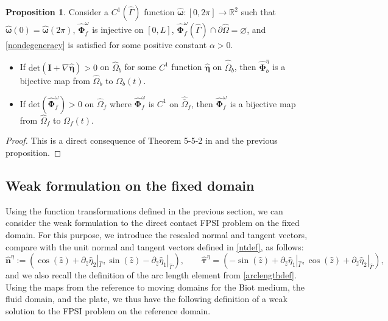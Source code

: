 \documentclass[11pt]{article}
\newcommand{\bd}{\boldsymbol}
\def\R{{\mathbb R}}
\theoremstyle{definition}
\newtheorem{proposition}{Proposition}[section]
\begin{document}
\begin{proposition}\label{mapinjective}
Consider a $C^{1}(\hat{\Gamma})$ function $\hat{\bd{\omega}}: [0, 2\pi] \to \R^{2}$ such that $\hat{\bd{\omega}}(0) = \hat{\bd{\omega}}(2\pi)$, $\hat{\bd{\Phi}}^{\omega}_{f}$ is injective on $[0, L]$, $\hat{\bd{\Phi}}^{\omega}_{f}(\hat{\Gamma}) \cap \partial \hat{\Omega} = \varnothing$, and \eqref{nondegeneracy} is satisfied for some positive constant $\alpha > 0$. 
\begin{itemize}
\item If $\text{det}(\bd{I} + \nabla \hat{\bd{\eta}}) > 0$ on $\hat{\Omega}_{b}$ for some $C^{1}$ function $\hat{\bd{\eta}}$ on $\hat{\overline{\Omega}}_{b}$, then $\hat{\bd{\Phi}}^{\eta}_{b}$ is a bijective map from $\hat{\Omega}_{b}$ to $\Omega_{b}(t)$. 
\item If $\text{det}(\hat{\bd{\Phi}}^{\omega}_{f}) > 0$ on $\hat{\Omega}_{f}$ where $\hat{\bd{\Phi}}^{\omega}_{f}$ is $C^{1}$ on $\hat{\overline{\Omega}}_{f}$, then $\hat{\bd{\Phi}}^{\omega}_{f}$ is a bijective map from $\hat{\Omega}_{f}$ to $\Omega_{f}(t)$. 
\end{itemize}
\end{proposition}

\begin{proof}
This is a direct consequence of Theorem 5-5-2 in \cite{Ciarlet} and the previous proposition.
\end{proof}

\subsection{Weak formulation on the fixed domain}

Using the function transformations defined in the previous section, we can consider the weak formulation to the direct contact FPSI problem on the fixed domain. For this purpose, we introduce the rescaled normal and tangent vectors, compare with the unit normal and tangent vectors defined in \eqref{ntdef}, as follows:
\begin{equation}\label{rescalednt}
\hat{\bd{n}}^{\eta} := (\cos(\hat{z}) + \partial_{\hat{z}}\hat{\eta}_{2}|_{\hat{\Gamma}}, \sin(\hat{z}) -  \partial_{\hat{z}}\hat{\eta}_{1}|_{\hat{\Gamma}}), \qquad \hat{\bd{\tau}}^{\eta} = (-\sin(\hat{z}) + \partial_{\hat{z}}\hat{\eta}_{1}|_{\hat{\Gamma}}, \cos(\hat{z}) + \partial_{\hat{z}}\hat{\eta}_{2}|_{\hat{\Gamma}}),
\end{equation}
and we also recall the definition of the arc length element from \eqref{arclengthdef}. Using the maps from the reference to moving domains for the Biot medium, the fluid domain, and the plate, we thus have the following definition of a weak solution to the FPSI problem on the reference domain.
\end{document}
